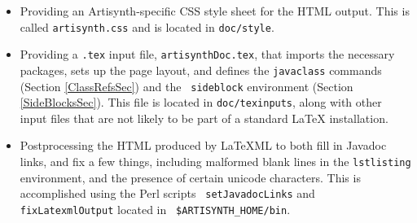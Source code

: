 \documentclass{article}
\begin{document}
\begin{itemize}

\item Providing an Artisynth-specific CSS style sheet for the HTML output.
This is called {\tt artisynth.css} and is located in {\tt doc/style}.

\item Providing a {\tt .tex} input file, {\tt artisynthDoc.tex}, that
imports the necessary packages, sets up the page layout, and defines
the {\tt \BKS javaclass} commands (Section \ref{ClassRefsSec}) and the {\tt
sideblock} environment (Section \ref{SideBlocksSec}).  This file is
located in {\tt doc/texinputs}, along with other input files that are
not likely to be part of a standard LaTeX installation.

\item Postprocessing the HTML produced by LaTeXML to both fill in
Javadoc links, and fix a few things, including malformed blank lines
in the {\tt lstlisting} environment, and the presence of certain
unicode characters.  This is accomplished using the Perl scripts {\tt
setJavadocLinks} and {\tt fixLatexmlOutput} located in {\tt
\$ARTISYNTH\_HOME/bin}.

\end{itemize}
\end{document}

